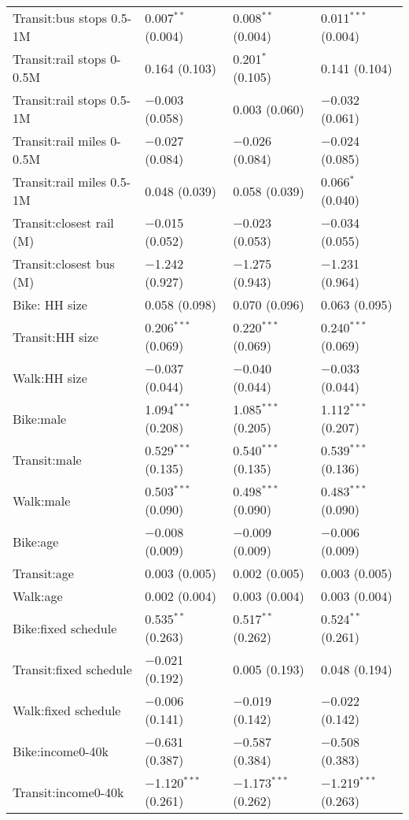 \begin{longtabu}{llll}
  Transit:bus stops 0.5-1M & 0.007$^{**}$ (0.004) & 0.008$^{**}$ (0.004) & 0.011$^{***}$ (0.004) \\ 
  Transit:rail stops 0-0.5M & 0.164 (0.103) & 0.201$^{*}$ (0.105) & 0.141 (0.104) \\ 
  Transit:rail stops 0.5-1M & $-$0.003 (0.058) & 0.003 (0.060) & $-$0.032 (0.061) \\ 
  Transit:rail miles 0-0.5M & $-$0.027 (0.084) & $-$0.026 (0.084) & $-$0.024 (0.085) \\ 
  Transit:rail miles 0.5-1M & 0.048 (0.039) & 0.058 (0.039) & 0.066$^{*}$ (0.040) \\ 
  Transit:closest rail (M) & $-$0.015 (0.052) & $-$0.023 (0.053) & $-$0.034 (0.055) \\ 
  Transit:closest bus (M) & $-$1.242 (0.927) & $-$1.275 (0.943) & $-$1.231 (0.964) \\ 
  Bike: HH size & 0.058 (0.098) & 0.070 (0.096) & 0.063 (0.095) \\ 
  Transit:HH size & 0.206$^{***}$ (0.069) & 0.220$^{***}$ (0.069) & 0.240$^{***}$ (0.069) \\ 
  Walk:HH size & $-$0.037 (0.044) & $-$0.040 (0.044) & $-$0.033 (0.044) \\ 
  Bike:male & 1.094$^{***}$ (0.208) & 1.085$^{***}$ (0.205) & 1.112$^{***}$ (0.207) \\ 
  Transit:male & 0.529$^{***}$ (0.135) & 0.540$^{***}$ (0.135) & 0.539$^{***}$ (0.136) \\ 
  Walk:male & 0.503$^{***}$ (0.090) & 0.498$^{***}$ (0.090) & 0.483$^{***}$ (0.090) \\ 
  Bike:age & $-$0.008 (0.009) & $-$0.009 (0.009) & $-$0.006 (0.009) \\ 
  Transit:age & 0.003 (0.005) & 0.002 (0.005) & 0.003 (0.005) \\ 
  Walk:age & 0.002 (0.004) & 0.003 (0.004) & 0.003 (0.004) \\ 
  Bike:fixed schedule & 0.535$^{**}$ (0.263) & 0.517$^{**}$ (0.262) & 0.524$^{**}$ (0.261) \\ 
  Transit:fixed schedule & $-$0.021 (0.192) & 0.005 (0.193) & 0.048 (0.194) \\ 
  Walk:fixed schedule & $-$0.006 (0.141) & $-$0.019 (0.142) & $-$0.022 (0.142) \\ 
  Bike:income0-40k & $-$0.631 (0.387) & $-$0.587 (0.384) & $-$0.508 (0.383) \\ 
  Transit:income0-40k & $-$1.120$^{***}$ (0.261) & $-$1.173$^{***}$ (0.262) & $-$1.219$^{***}$ (0.263) \\ 

\end{longtabu}
